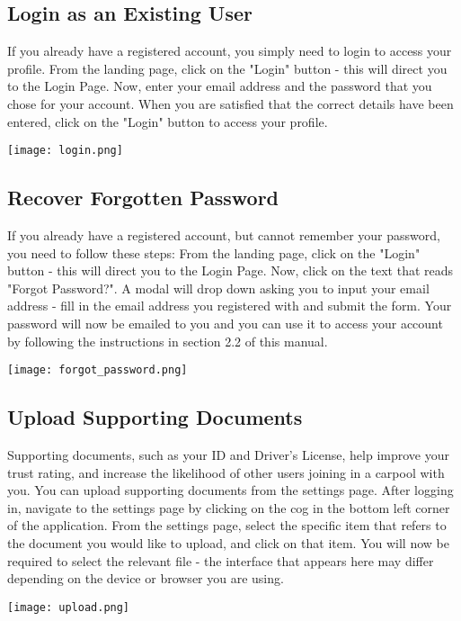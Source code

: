 \documentclass[12pt]{article}
\begin{document}
\subsection{Login as an Existing User}
If you already have a registered account, you simply need to login to access your profile. From the landing page, click on the "Login" button - this will direct you to the Login Page. Now, enter your email address and the password that you chose for your account. When you are satisfied that the correct details have been entered, click on the "Login" button to access your profile.
\begin{center}
\texttt{[image: login.png]}
\end{center}

\subsection{Recover Forgotten Password}
If you already have a registered account, but cannot remember your password, you need to follow these steps: From the landing page, click on the "Login" button - this will direct you to the Login Page. Now, click on the text that reads "Forgot Password?". A modal will drop down asking you to input your email address - fill in the email address you registered with and submit the form. Your password will now be emailed to you and you can use it to access your account by following the instructions in section 2.2 of this manual.
\begin{center}
\texttt{[image: forgot\_password.png]}
\end{center}

\subsection{Upload Supporting Documents}
Supporting documents, such as your ID and Driver's License, help improve your trust rating, and increase the likelihood of other users joining in a carpool with you. You can upload supporting documents from the settings page. After logging in, navigate to the settings page by clicking on the cog in the bottom left corner of the application. From the settings page, select the specific item that refers to the document you would like to upload, and click on that item. You will now be required to select the relevant file - the interface that appears here may differ depending on the device or browser you are using.
\begin{center}
\texttt{[image: upload.png]}
\end{center}
\end{document}
